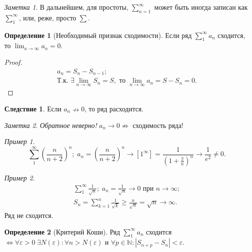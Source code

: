 \documentclass[a4paper,12pt]{article}
\theoremstyle{remark}
\newtheorem*{note}{Заметка}
\newtheorem*{example}{Пример}
\theoremstyle{definition}
\newtheorem{definition}{Определение}
\newtheorem*{effect}{Следствие}
\begin{document}
\begin{note}
    В дальнейшем, для простоты, \(\sum_{n=1}^{\infty}\) может быть иногда записан как \(\sum_{1}^{\infty}\), или, реже, просто \(\sum\).
\end{note}


\begin{definition}[Необходимый признак сходимости]
    Если ряд \(\sum^{\infty}_{1} a_n\) сходится, то \(\lim_{a \rightarrow \infty} a_n = 0\).
\end{definition}

\begin{proof}
    \begin{gather*}
        a_n = S_n - S_{n - 1}; \\
        \text{Т.к. } \exists \lim_{n \rightarrow \infty} S_n = S, \text{ то } \lim_{n \rightarrow \infty} a_n = S - S_n = 0.
    \end{gather*}
\end{proof}

\begin{effect}
    Если \(a_n \nrightarrow 0\), то ряд расходится.
\end{effect}

\begin{note}
    \emph{Обратное неверно!} \(a_n \rightarrow 0 \nRightarrow\) сходимость ряда!
\end{note}

\begin{example}
    \begin{equation*}
        \sum^{\infty}_{1} \left(\frac{n}{n+2}\right)^{n} \!;\; a_n = \left(\frac{n}{n+2}\right)^{n} \rightarrow \left[1^\infty\right] = \frac{1}{\left(1 + \frac{2}{n}\right)^n} \rightarrow \frac{1}{e^2} \neq 0.
    \end{equation*}
\end{example}

\begin{example}
    \begin{gather*}
        \sum^{\infty}_{1} \frac{1}{\sqrt{n}};\; a_n = \frac{1}{\sqrt{n}} \rightarrow 0 \text{ при } n \rightarrow \infty; \\
        S_n = \sum^n_{k=1} \frac{1}{\sqrt{k}} \geqslant \frac{n}{\sqrt{n}} = \sqrt{n} \rightarrow \infty.
    \end{gather*}
    Ряд не сходится.
\end{example}

\begin{definition}[Критерий Коши]
    Ряд \(\sum_1^\infty a_n\) сходится \(\Leftrightarrow \forall \varepsilon > 0\; \exists N(\varepsilon): \forall n > N(\varepsilon) \text{ и } \forall p \in \mathbb{N}: |S_{n + p} - S_n| < \varepsilon\).
\end{definition}
\end{document}
